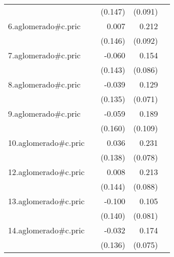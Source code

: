 {\begin{longtable}{l*{4}{D{.}{.}{-1}}}
            &                     &     (0.147)         &     (0.091)         &                     \\
\addlinespace
6.aglomerado#c.pric&                     &       0.007         &       0.212\sym{*}  &                     \\
            &                     &     (0.146)         &     (0.092)         &                     \\
\addlinespace
7.aglomerado#c.pric&                     &      -0.060         &       0.154         &                     \\
            &                     &     (0.143)         &     (0.086)         &                     \\
\addlinespace
8.aglomerado#c.pric&                     &      -0.039         &       0.129         &                     \\
            &                     &     (0.135)         &     (0.071)         &                     \\
\addlinespace
9.aglomerado#c.pric&                     &      -0.059         &       0.189         &                     \\
            &                     &     (0.160)         &     (0.109)         &                     \\
\addlinespace
10.aglomerado#c.pric&                     &       0.036         &       0.231\sym{**} &                     \\
            &                     &     (0.138)         &     (0.078)         &                     \\
\addlinespace
12.aglomerado#c.pric&                     &       0.008         &       0.213\sym{*}  &                     \\
            &                     &     (0.144)         &     (0.088)         &                     \\
\addlinespace
13.aglomerado#c.pric&                     &      -0.100         &       0.105         &                     \\
            &                     &     (0.140)         &     (0.081)         &                     \\
\addlinespace
14.aglomerado#c.pric&                     &      -0.032         &       0.174\sym{*}  &                     \\
            &                     &     (0.136)         &     (0.075)         &                     \\

\end{longtable}}
